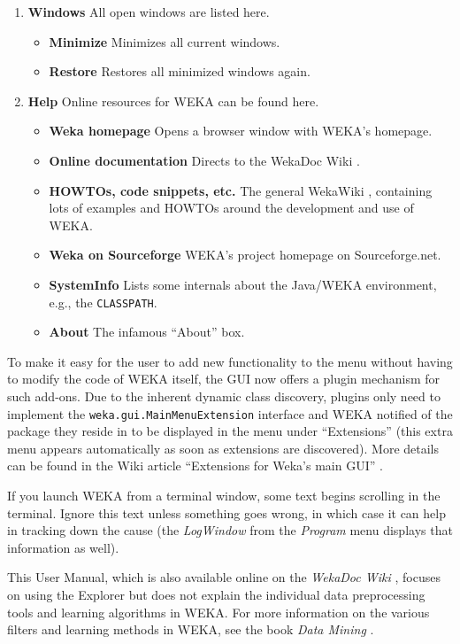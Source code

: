 \documentclass[a4paper]{article}
\begin{document}
\begin{enumerate}
	\item \textbf{Windows} All open windows are listed here.
		\begin{itemize}
			\item \textbf{Minimize} Minimizes all current windows.
			\item \textbf{Restore} Restores all minimized windows again.
		\end{itemize}
		
	\item \textbf{Help} Online resources for WEKA can be found here.
		\begin{itemize}
			\item \textbf{Weka homepage} Opens a browser window with WEKA's homepage.
			\item \textbf{Online documentation} Directs to the WekaDoc Wiki \cite{wekadoc}.
			\item \textbf{HOWTOs, code snippets, etc.} The general WekaWiki \cite{wekawiki}, containing lots of examples and HOWTOs around the development and use of WEKA.
			\item \textbf{Weka on Sourceforge} WEKA's project homepage on Sourceforge.net.
			\item \textbf{SystemInfo} Lists some internals about the Java/WEKA environment, e.g., the \texttt{CLASSPATH}.
			\item \textbf{About} The infamous ``About'' box.
		\end{itemize}
\end{enumerate}

To make it easy for the user to add new functionality to the menu without having to modify 
the code of WEKA itself, the GUI now offers a plugin mechanism for such add-ons. 
Due to the inherent dynamic
class discovery, plugins only need to implement the \texttt{weka.gui.MainMenuExtension}
interface and WEKA notified of the package they reside in to be displayed in the menu under 
``Extensions'' (this extra menu appears automatically as soon as extensions are discovered). 
More details can be found in the Wiki article ``Extensions for Weka's main GUI'' 
\cite{mainextensions}.

If you launch WEKA from a terminal window, some text begins scrolling in the
terminal. Ignore this text unless something goes wrong, in which case it can
help in tracking down the cause (the \textit{LogWindow} from the \textit{Program} menu 
displays that information as well).

This User Manual, which is also available online on the \textit{WekaDoc Wiki} 
\cite{wekadoc}, focuses on using the Explorer but does not explain
the individual data preprocessing tools and learning algorithms in
WEKA. For more information on the various filters and learning methods
in WEKA, see the book {\em Data Mining} \cite{witten}.
\end{document}
